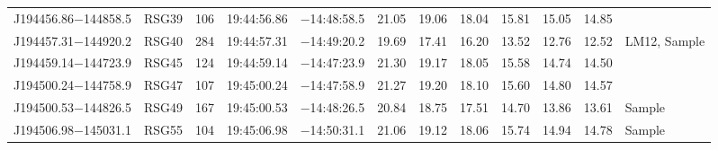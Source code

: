 \documentclass[iop]{emulateapj}
\begin{document}
\begin{table*}
\begin{center}
\begin{tabular}{llrccccccccl}
J194456.86$-$144858.5  &  RSG39  & 106 &   19:44:56.86  &  $-$14:48:58.5  &  21.05  &  19.06  &  18.04  &  15.81  &  15.05  &  14.85 \\
J194457.31$-$144920.2  &  RSG40  & 284 &   19:44:57.31  &  $-$14:49:20.2  &  19.69  &  17.41  &  16.20  &  13.52  &  12.76  &  12.52 & LM12, Sample \\
J194459.14$-$144723.9  &  RSG45  & 124 &   19:44:59.14  &  $-$14:47:23.9  &  21.30  &  19.17  &  18.05  &  15.58  &  14.74  &  14.50 \\
J194500.24$-$144758.9  &  RSG47  & 107 &   19:45:00.24  &  $-$14:47:58.9  &  21.27  &  19.20  &  18.10  &  15.60  &  14.80  &  14.57 \\
J194500.53$-$144826.5  &  RSG49  & 167 &   19:45:00.53  &  $-$14:48:26.5  &  20.84  &  18.75  &  17.51  &  14.70  &  13.86  &  13.61 & Sample\\
J194506.98$-$145031.1  &  RSG55  & 104 &   19:45:06.98  &  $-$14:50:31.1  &  21.06  &  19.12  &  18.06  &  15.74  &  14.94  &  14.78 & Sample\\

\hline
\end{tabular}
\end{center}
\end{table*}
\end{document}
